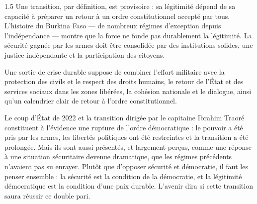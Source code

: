 \documentclass[12pt]{article}
\begin{document}
\begin{spacing}{1.5}
Une transition, par définition, est provisoire : sa légitimité dépend de sa capacité à préparer un retour à un ordre constitutionnel accepté par tous. L'histoire du Burkina Faso — de nombreux régimes d'exception depuis l'indépendance — montre que la force ne fonde pas durablement la légitimité. La sécurité gagnée par les armes doit être consolidée par des institutions solides, une justice indépendante et la participation des citoyens.

Une sortie de crise durable suppose de combiner l'effort militaire avec la protection des civils et le respect des droits humains, le retour de l'État et des services sociaux dans les zones libérées, la cohésion nationale et le dialogue, ainsi qu'un calendrier clair de retour à l'ordre constitutionnel.


Le coup d'État de 2022 et la transition dirigée par le capitaine Ibrahim Traoré constituent à l'évidence une rupture de l'ordre démocratique : le pouvoir a été pris par les armes, les libertés politiques ont été restreintes et la transition a été prolongée. Mais ils sont aussi présentés, et largement perçus, comme une réponse à une situation sécuritaire devenue dramatique, que les régimes précédents n'avaient pas su enrayer. Plutôt que d'opposer sécurité et démocratie, il faut les penser ensemble : la sécurité est la condition de la démocratie, et la légitimité démocratique est la condition d'une paix durable. L'avenir dira si cette transition saura réussir ce double pari.

\end{spacing}
\end{document}

